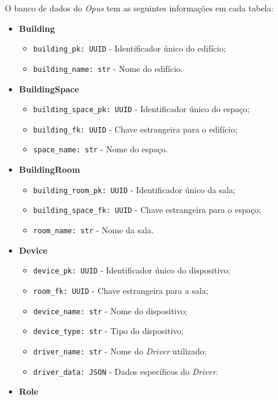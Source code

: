 O banco de dados do \emph{Opus} tem as seguintes informações em cada tabela:
\begin{itemize}
    \item \textbf{Building}  
      \begin{itemize}
          \item \texttt{building\_pk: UUID} - Identificador único do edifício;
          \item \texttt{building\_name: str} - Nome do edifício.
      \end{itemize}
    \item \textbf{BuildingSpace}  
      \begin{itemize}
          \item \texttt{building\_space\_pk: UUID} - Identificador único do espaço;
          \item \texttt{building\_fk: UUID} - Chave estrangeira para o edifício;
          \item \texttt{space\_name: str} - Nome do espaço.
      \end{itemize}
    \item \textbf{BuildingRoom}  
      \begin{itemize}
          \item \texttt{building\_room\_pk: UUID} - Identificador único da sala;
          \item \texttt{building\_space\_fk: UUID} - Chave estrangeira para o espaço;
          \item \texttt{room\_name: str} - Nome da sala.
      \end{itemize}
    \item \textbf{Device}  
      \begin{itemize}
          \item \texttt{device\_pk: UUID} - Identificador único do dispositivo;
          \item \texttt{room\_fk: UUID} - Chave estrangeira para a sala;
          \item \texttt{device\_name: str} - Nome do dispositivo;
          \item \texttt{device\_type: str} - Tipo do dispositivo;
          \item \texttt{driver\_name: str} - Nome do \emph{Driver} utilizado;
          \item \texttt{driver\_data: JSON} - Dados específicos do \emph{Driver}.
      \end{itemize}
    \item \textbf{Role}  
      \begin{itemize}

\end{itemize}
\end{itemize}
